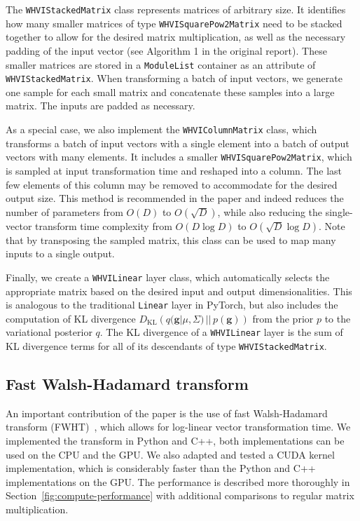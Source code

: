 The \texttt{WHVIStackedMatrix} class represents matrices of arbitrary size.
It identifies how many smaller matrices of type \texttt{WHVISquarePow2Matrix} need to be stacked together to allow for the desired matrix multiplication, as well as the necessary padding of the input vector (see Algorithm 1 in the original report).
These smaller matrices are stored in a \texttt{ModuleList} container as an attribute of \texttt{WHVIStackedMatrix}.
When transforming a batch of input vectors, we generate one sample for each small matrix and concatenate these samples into a large matrix.
The inputs are padded as necessary.

As a special case, we also implement the \texttt{WHVIColumnMatrix} class, which transforms a batch of input vectors with a single element into a batch of output vectors with many elements.
It includes a smaller \texttt{WHVISquarePow2Matrix}, which is sampled at input transformation time and reshaped into a column.
The last few elements of this column may be removed to accommodate for the desired output size.
This method is recommended in the paper and indeed reduces the number of parameters from $O(D)$ to $O(\sqrt{D})$, while also reducing the single-vector transform time complexity from $O(D\log D)$ to $O(\sqrt{D}\log D)$.
Note that by transposing the sampled matrix, this class can be used to map many inputs to a single output.

Finally, we create a \texttt{WHVILinear} layer class, which automatically selects the appropriate matrix based on the desired input and output dimensionalities.
This is analogous to the traditional \texttt{Linear} layer in PyTorch, but also includes the computation of KL divergence $D_\mathrm{KL}\left(q(\mathbf{g}|\mu, \Sigma)\, ||\, p(\mathbf{g})\right)$ from the prior $p$ to the variational posterior $q$.
The KL divergence of a \texttt{WHVILinear} layer is the sum of KL divergence terms for all of its descendants of type \texttt{WHVIStackedMatrix}.

\subsection{Fast Walsh-Hadamard transform}\label{subsec:fast-walsh-hadamard-transform}
An important contribution of the paper is the use of fast Walsh-Hadamard transform (FWHT)~\cite{fino1976unified}, which allows for log-linear vector transformation time.
We implemented the transform in Python and C++, both implementations can be used on the CPU and the GPU\@.
We also adapted and tested a CUDA kernel implementation, which is considerably faster than the Python and C++ implementations on the GPU\@.
The performance is described more thoroughly in Section~\ref{fig:compute-performance} with additional comparisons to regular matrix multiplication.

